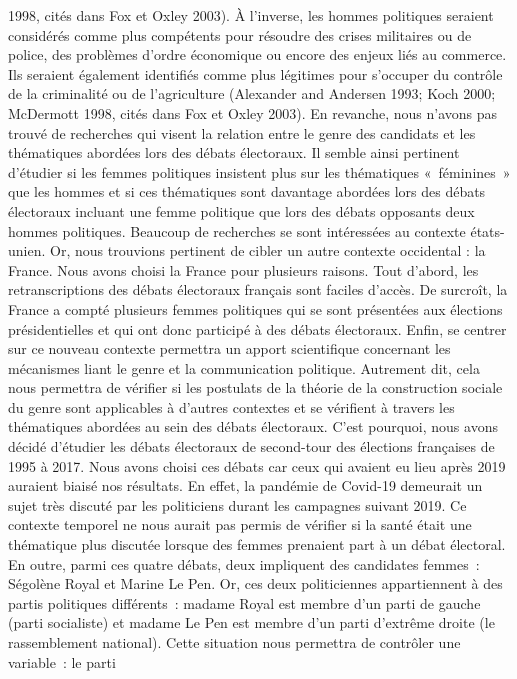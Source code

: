 \documentclass[
  letterpaper,
  DIV=11,
  numbers=noendperiod]{scrartcl}
\begin{document}
1998, cités dans Fox et Oxley 2003). À l'inverse, les hommes politiques
seraient considérés comme plus compétents pour résoudre des crises
militaires ou de police, des problèmes d'ordre économique ou encore des
enjeux liés au commerce. Ils seraient également identifiés comme plus
légitimes pour s'occuper du contrôle de la criminalité ou de
l'agriculture (Alexander and Andersen 1993; Koch 2000; McDermott 1998,
cités dans Fox et Oxley 2003). En revanche, nous n'avons pas trouvé de
recherches qui visent la relation entre le genre des candidats et les
thématiques abordées lors des débats électoraux. Il semble ainsi
pertinent d'étudier si les femmes politiques insistent plus sur les
thématiques «~féminines~» que les hommes et si ces thématiques sont
davantage abordées lors des débats électoraux incluant une femme
politique que lors des débats opposants deux hommes politiques. Beaucoup
de recherches se sont intéressées au contexte états-unien. Or, nous
trouvions pertinent de cibler un autre contexte occidental : la France.
Nous avons choisi la France pour plusieurs raisons. Tout d'abord, les
retranscriptions des débats électoraux français sont faciles d'accès. De
surcroît, la France a compté plusieurs femmes politiques qui se sont
présentées aux élections présidentielles et qui ont donc participé à des
débats électoraux. Enfin, se centrer sur ce nouveau contexte permettra
un apport scientifique concernant les mécanismes liant le genre et la
communication politique. Autrement dit, cela nous permettra de vérifier
si les postulats de la théorie de la construction sociale du genre sont
applicables à d'autres contextes et se vérifient à travers les
thématiques abordées au sein des débats électoraux. C'est pourquoi, nous
avons décidé d'étudier les débats électoraux de second-tour des
élections françaises de 1995 à 2017. Nous avons choisi ces débats car
ceux qui avaient eu lieu après 2019 auraient biaisé nos résultats. En
effet, la pandémie de Covid-19 demeurait un sujet très discuté par les
politiciens durant les campagnes suivant 2019. Ce contexte temporel ne
nous aurait pas permis de vérifier si la santé était une thématique plus
discutée lorsque des femmes prenaient part à un débat électoral. En
outre, parmi ces quatre débats, deux impliquent des candidates femmes~:
Ségolène Royal et Marine Le Pen. Or, ces deux politiciennes
appartiennent à des partis politiques différents~: madame Royal est
membre d'un parti de gauche (parti socialiste) et madame Le Pen est
membre d'un parti d'extrême droite (le rassemblement national). Cette
situation nous permettra de contrôler une variable~: le parti
\end{document}
